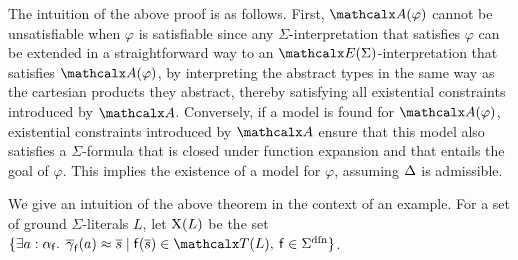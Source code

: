 The intuition of the above proof is as follows.
First, $\conv( \varphi )$ cannot be unsatisfiable when $\varphi$ is satisfiable
since any $\Sigma$-interpretation that satisfies $\varphi$ can be extended in a straightforward way to 
an $\extendsig{\Sigma}$-interpretation that satisfies $\conv( \varphi )$, by
interpreting the abstract types in the same way as the cartesian products they
abstract, thereby satisfying all existential constraints introduced by $\conv$.
Conversely, if a model is found for $\conv( \varphi )$,
existential constraints
introduced by $\conv$ ensure that this model also satisfies
a $\Sigma$-formula that is closed under function expansion and
that entails the goal of $\varphi$.
This implies the existence of a model for $\varphi$,
assuming $\DDD$ is admissible.

\begin{conf}
We give an intuition of the above theorem in the context of an example.
For a set of ground $\Sigma$-literals $L$, let $\mathrm{X}( L )$ be the set
$\{ \exists a : {\fargtype{\con{f}}}.\;\, \vecfarg{\con{f}}( a ) \teq \vec s
\mid \con{f}( \vec s ) \in \terms( L ),\: \con{f} \in \sfundefs{\Sigma}
\}$.
\end{conf}


